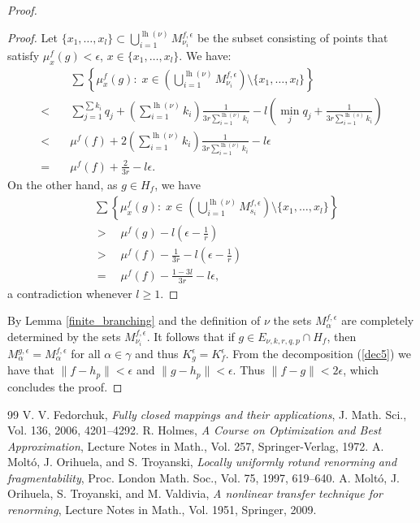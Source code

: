 \documentclass[10pt,a4paper]{amsart}
\DeclareMathOperator{\lgth}{lh}
\begin{document}
\begin{proof}
\begin{proof}
		Let $\{x_1, \dots, x_l\} \subset \bigcup\limits_{i = 1}^{\lgth(\nu)} M^{f,\epsilon}_{\nu_i}$ be the subset consisting of points that satisfy $\mu^f_{x} (g) < \epsilon$, $x \in \{x_1, \dots, x_l\}$. We have:
		\begin{align*}
			&\sum \left\{\mu^f_x (g): \; x \in \left(\bigcup_{i = 1}^{\lgth(\nu)} M^{f, \epsilon}_{\nu_i}\right) \setminus \{x_1, \dots, x_l\}\right\} \\
			< \quad &\sum_{j = 1}^{\sum k_i} q_j + \left(\sum_{i = 1}^{\lgth(\nu)} k_i\right) \frac{1}{3 r \sum_{i = 1}^{\lgth(\nu)} k_i} - l\left(\min_j q_j + \frac{1}{3 r \sum_{i = 1}^{\lgth(s)} k_i}\right) \\
			< \quad& \mu^f (f) + 2 \left(\sum_{i = 1}^{\lgth(\nu)} k_i\right) \frac{1}{3 r \sum_{i = 1}^{\lgth(\nu)} k_i} - l\epsilon \\
			= \quad&\mu^f (f) + \frac{2}{3r} - l \epsilon.
		\end{align*}
		On the other hand, as $g \in H_f$, we have
		\begin{align*}
			&\sum \left\{\mu^f_x (g): \; x \in \left(\bigcup_{i = 1}^{\lgth(\nu)} M^{f, \epsilon}_{s_i}\right) \setminus \{x_1, \dots, x_l\}\right\} \\
			&> \quad \mu^f (g) - l \left(\epsilon - \frac{1}{r}\right) \\
			&> \quad \mu^f (f) - \frac{1}{3r} - l \left(\epsilon - \frac{1}{r}\right) \\
			&= \quad \mu^f (f) - \frac{1 - 3l}{3r} - l\epsilon,
		\end{align*}
		a contradiction whenever $l \geq 1$.
	\end{proof}
	
	By Lemma \ref{finite_branching} and the definition of $\nu$ the sets $M^{f, \epsilon}_\alpha$ are completely determined by the sets $M^{f, \epsilon}_{\nu_i}$. It follows that if $g \in E_{\nu,k,r,q,p} \cap H_f$, then $M^{g, \epsilon}_\alpha = M^{f, \epsilon}_\alpha$ for all $\alpha \in \gamma$ and thus $K^\epsilon_g = K^\epsilon_f$. From the decomposition (\ref{dec5}) we have that $\|f - h_p\| < \epsilon$ and $\|g - h_p\| < \epsilon$. Thus $\|f-g\| < 2 \epsilon$, which concludes the proof.
\end{proof}

\begin{thebibliography}{99}
 V. V. Fedorchuk, \emph{Fully closed mappings and their applications}, J. Math. Sci., Vol. 136, 2006, 4201--4292.
 R. Holmes, \emph{A Course on Optimization and Best Approximation}, Lecture Notes in Math., Vol. 257, Springer-Verlag, 1972.
 A. Molt\'o, J. Orihuela, and S. Troyanski, \emph{Locally uniformly rotund renorming and fragmentability}, Proc. London Math. Soc., Vol. 75, 1997, 619--640.
 A. Molt\'o, J. Orihuela, S. Troyanski, and M. Valdivia, \emph{A nonlinear transfer technique for renorming}, Lecture Notes in Math., Vol. 1951, Springer, 2009.
\end{thebibliography}
\end{document}
